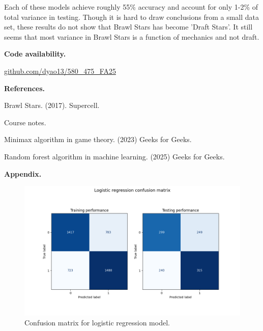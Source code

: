 \documentclass[12pt]{article}
\begin{document}
Each of these models achieve roughly 55\% accuracy and account for only 1-2\% of total variance in testing. Though it is hard to draw conclusions from a small data set, these results do not show that Brawl Stars has become 'Draft Stars'. It still seems that most variance in Brawl Stars is a function of mechanics and not draft.

\textbf{Code availability.}

\href{https://github.com/dyao13/580_475_FA25}{github.com/dyao13/580\_475\_FA25}

\newpage \textbf{References.}

Brawl Stars. (2017). Supercell.

Course notes.

Minimax algorithm in game theory. (2023) Geeks for Geeks.

Random forest algorithm in machine learning. (2025) Geeks for Geeks.

\newpage \textbf{Appendix.}

\begin{figure}[h!]
\centering
\begin{center} \includegraphics[width=6in]{"../output/lr_confusion_matrix.png"} \end{center}
\caption{Confusion matrix for logistic regression model.}
\label{fig:lr-cm}
\end{figure}

\newpage 
\end{document}
